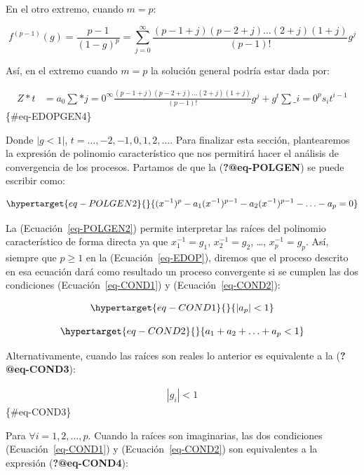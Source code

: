 \documentclass[
  a4paper,
]{article}
\begin{document}
En el otro extremo, cuando \(m = p\):

\[
f^{(p-1)}(g) = \frac{p-1}{(1 - g)^p} = \sum_{j = 0}^{\infty} \frac{(p-1+j)(p-2+j) \ldots (2+j)(1+j)}{(p-1)!} g^j
\]

Así, en el extremo cuando \(m = p\) la solución general podría estar
dada por:

\begin{align}
Z*t & = a_0 \sum*{j = 0}^{\infty} \frac{(p-1+j)(p-2+j) \ldots (2+j)(1+j)}{(p-1)!} g^j + g^t \sum\_{i = 0}^p s_i t^{i-1}
\end{align} \{\#eq-EDOPGEN4\}

Donde \(|{g} < 1|\), \(t = \ldots, -2, -1, 0, 1, 2, \ldots\). Para
finalizar esta sección, plantearemos la expresión de polinomio
característico que nos permitirá hacer el análisis de convergencia de
los procesos. Partamos de que la (\textbf{?@eq-POLGEN}) se puede
escribir como:

\begin{equation}\protect\hypertarget{eq-POLGEN2}{}{
(x^{-1})^p - a_1 (x^{-1})^{p-1} - a_2 (x^{-1})^{p-1} - \ldots - a_p = 0
}\label{eq-POLGEN2}\end{equation}

La (Ecuación~\ref{eq-POLGEN2}) permite interpretar las raíces del
polinomio característico de forma directa ya que \(x^{-1}_1 = g_1\),
\(x^{-1}_2 = g_2\), \ldots, \(x^{-1}_p = g_p\). Así, siempre que
\(p \geq 1\) en la (Ecuación~\ref{eq-EDOP}), diremos que el proceso
descrito en esa ecuación dará como resultado un proceso convergente si
se cumplen las dos condiciones (Ecuación~\ref{eq-COND1}) y
(Ecuación~\ref{eq-COND2}):

\begin{equation}\protect\hypertarget{eq-COND1}{}{
|a_p| < 1
}\label{eq-COND1}\end{equation}

\begin{equation}\protect\hypertarget{eq-COND2}{}{
a_1 + a_2 + \ldots + a_p < 1
}\label{eq-COND2}\end{equation}

Alternativamente, cuando las raíces son reales lo anterior es
equivalente a la (\textbf{?@eq-COND3}):

\begin{align}
|g_i| < 1
\end{align} \{\#eq-COND3\}

Para \(\forall i = 1, 2, \ldots, p\). Cuando la raíces son imaginarias,
las dos condiciones (Ecuación~\ref{eq-COND1}) y
(Ecuación~\ref{eq-COND2}) son equivalentes a la expresión
(\textbf{?@eq-COND4}):
\end{document}
